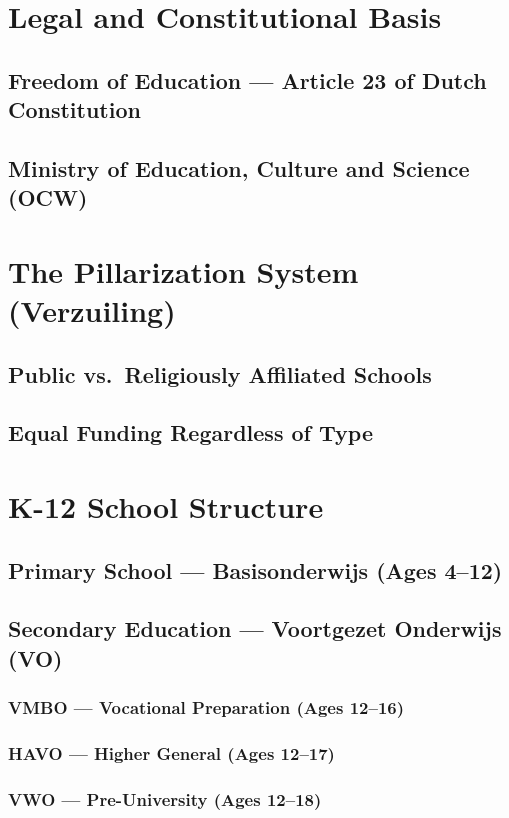 \section{Legal and Constitutional Basis}
\subsection{Freedom of Education --- Article 23 of Dutch Constitution}
\subsection{Ministry of Education, Culture and Science (OCW)}

\section{The Pillarization System (Verzuiling)}
\subsection{Public vs.\ Religiously Affiliated Schools}
\subsection{Equal Funding Regardless of Type}

\section{K-12 School Structure}
\subsection{Primary School --- Basisonderwijs (Ages 4--12)}
\subsection{Secondary Education --- Voortgezet Onderwijs (VO)}
\subsubsection{VMBO --- Vocational Preparation (Ages 12--16)}
\subsubsection{HAVO --- Higher General (Ages 12--17)}
\subsubsection{VWO --- Pre-University (Ages 12--18)}
